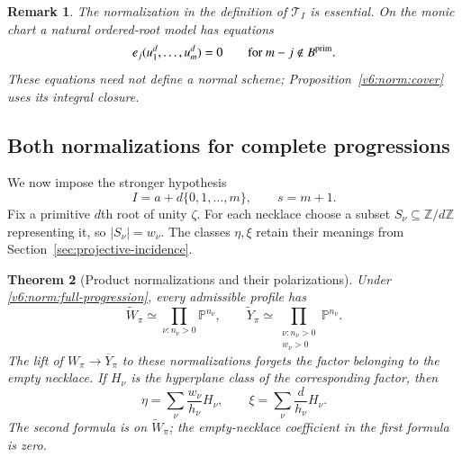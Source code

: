\documentclass[10pt,fleqn]{article}
\numberwithin{equation}{section}
\newtheorem{theorem}{Theorem}[section]
\newtheorem{remark}[theorem]{Remark}
\newcommand{\PP}{\mathbb P}
\begin{document}
\begin{remark}\label{v6:norm:ordered-root-warning}
The normalization in the definition of $\mathcal T_I$ is essential.
On the monic chart a natural ordered-root model has equations
\[
 e_j(u_1^d,\ldots,u_m^d)=0
 \qquad\text{for }m-j\notin B^{\rm prim}.
\]
These equations need not define a normal scheme;
Proposition~\ref{v6:norm:cover} uses its integral closure.
\end{remark}

\subsection{Both normalizations for complete progressions}

We now impose the stronger hypothesis
\begin{equation}\label{v6:norm:full-progression}
 I=a+d\{0,1,\ldots,m\},\qquad s=m+1.
\end{equation}
Fix a primitive $d$th root of unity $\zeta$.  For each necklace choose
a subset $S_\nu\subseteq\mathbb Z/d\mathbb Z$ representing it, so
$|S_\nu|=w_\nu$.  The classes $\eta,\xi$ retain their meanings from
Section~\ref{sec:projective-incidence}.

\begin{theorem}[Product normalizations and their polarizations]
\label{v6:norm:product}
Under \eqref{v6:norm:full-progression}, every admissible profile has
\begin{equation}\label{v6:norm:product-formulas}
 \widetilde W_\pi\simeq
       \prod_{\nu:n_\nu>0}\PP^{n_\nu},\qquad
 \widetilde Y_\pi\simeq
       \prod_{\substack{\nu:n_\nu>0\\w_\nu>0}}\PP^{n_\nu}.
\end{equation}
The lift of $W_\pi\longrightarrow\overline Y_\pi$ to these
normalizations forgets the factor belonging to the empty necklace.
If $H_\nu$ is the hyperplane class of the corresponding factor, then
\begin{equation}\label{v6:norm:polarizations}
 \eta=\sum_\nu\frac{w_\nu}{h_\nu}H_\nu,
 \qquad
 \xi=\sum_\nu\frac d{h_\nu}H_\nu.
\end{equation}
The second formula is on $\widetilde W_\pi$; the empty-necklace
coefficient in the first formula is zero.
\end{theorem}
\end{document}
